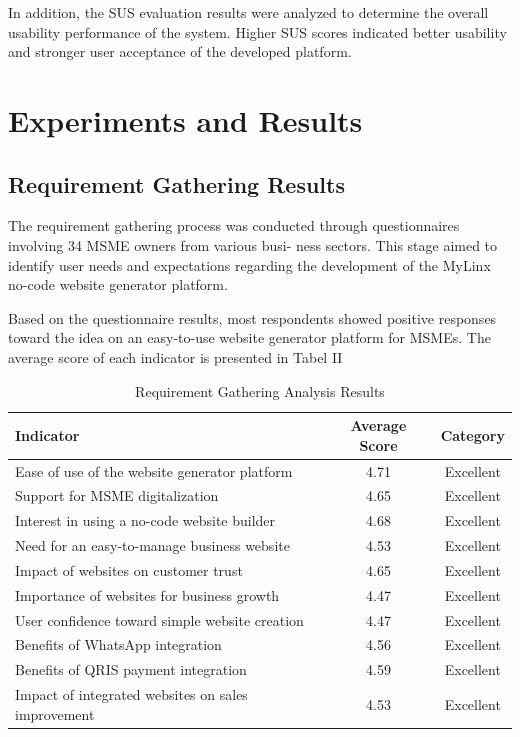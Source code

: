 \documentclass[conference]{IEEEtran}
\begin{document}
In addition, the SUS evaluation results were analyzed to determine the overall usability performance of the system. Higher SUS scores indicated better usability and stronger user acceptance of the developed platform.


\section{Experiments and Results}

\subsection{Requirement Gathering Results}

The requirement gathering process was conducted through questionnaires involving 34 MSME owners from various busi- ness sectors. This stage aimed to identify user needs and expectations regarding the development of the MyLinx no-code website generator platform.

Based on the questionnaire results, most respondents showed positive responses toward the idea on an easy-to-use website generator platform for MSMEs. The average score of each indicator is presented in Tabel II

\begin{table}[H]
\centering
\caption{Requirement Gathering Analysis Results}
\begin{tabular}{p{4.5cm}cc}
\hline
\textbf{Indicator} & \textbf{Average Score} & \textbf{Category} \\
\hline
Ease of use of the website generator platform & 4.71 & Excellent \\
Support for MSME digitalization & 4.65 & Excellent \\
Interest in using a no-code website builder & 4.68 & Excellent \\
Need for an easy-to-manage business website & 4.53 & Excellent \\
Impact of websites on customer trust & 4.65 & Excellent \\
Importance of websites for business growth & 4.47 & Excellent \\
User confidence toward simple website creation & 4.47 & Excellent \\
Benefits of WhatsApp integration & 4.56 & Excellent \\
Benefits of QRIS payment integration & 4.59 & Excellent \\
Impact of integrated websites on sales improvement & 4.53 & Excellent \\
\hline
\end{tabular}
\label{tab:requirement_analysis}
\end{table}
\end{document}
